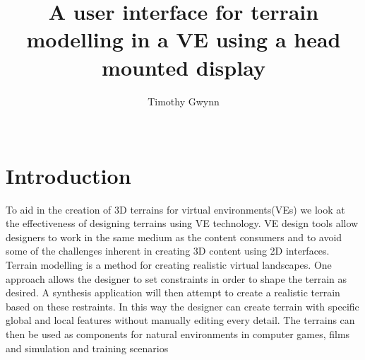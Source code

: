\documentclass{sig-alternate-05-2015}
\begin{document}
\title{A user interface for terrain modelling in a VE using a head mounted display}

\author{
\alignauthor
Timothy Gwynn\\
       \\
}
\maketitle
\begin{CCSXML}

\end{CCSXML}



\printccsdesc

\section{Introduction}
To aid in the creation of 3D terrains for virtual environments(VEs) we look at the effectiveness of designing terrains using VE technology. VE design tools allow designers to work in the same medium as the content consumers and to avoid some of the challenges inherent in creating 3D content using 2D interfaces.\\

Terrain modelling is a method for creating realistic virtual landscapes. One approach allows the designer to set constraints in order to shape the terrain as desired. A synthesis application will then attempt to create a realistic terrain based on these restraints. In this way the designer can create terrain with specific global and local features without manually editing every detail. The terrains can then be used as components for natural environments in computer games, films and simulation and training scenarios\cite{Gain2015}
\end{document}
